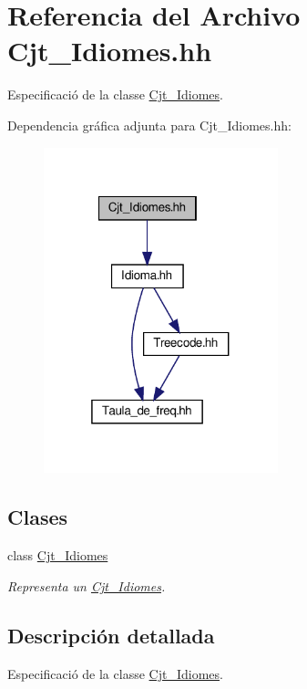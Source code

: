 \hypertarget{_cjt___idiomes_8hh}{}\section{Referencia del Archivo Cjt\+\_\+\+Idiomes.\+hh}
\label{_cjt___idiomes_8hh}


Especificació de la classe \hyperlink{class_cjt___idiomes}{Cjt\+\_\+\+Idiomes}.  


Dependencia gráfica adjunta para Cjt\+\_\+\+Idiomes.\+hh\+:\nopagebreak
\begin{figure}[H]
\begin{center}
\leavevmode
\includegraphics[width=193pt]{_cjt___idiomes_8hh__incl}
\end{center}
\end{figure}
\subsection*{Clases}
\begin{DoxyCompactItemize}
\item 
class \hyperlink{class_cjt___idiomes}{Cjt\+\_\+\+Idiomes}
\begin{DoxyCompactList}\small\item\em Representa un \hyperlink{class_cjt___idiomes}{Cjt\+\_\+\+Idiomes}. \end{DoxyCompactList}\end{DoxyCompactItemize}


\subsection{Descripción detallada}
Especificació de la classe \hyperlink{class_cjt___idiomes}{Cjt\+\_\+\+Idiomes}. 

